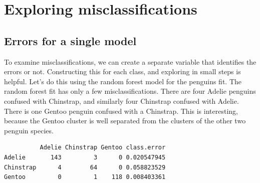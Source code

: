 \documentclass[
  letterpaper,
]{krantz}
\newenvironment{Shaded}{\begin{snugshade}}{\end{snugshade}}
\newcommand{\AttributeTok}[1]{\textcolor[rgb]{0.40,0.45,0.13}{#1}}
\newcommand{\DecValTok}[1]{\textcolor[rgb]{0.68,0.00,0.00}{#1}}
\newcommand{\FunctionTok}[1]{\textcolor[rgb]{0.28,0.35,0.67}{#1}}
\newcommand{\NormalTok}[1]{\textcolor[rgb]{0.00,0.23,0.31}{#1}}
\newcommand{\OtherTok}[1]{\textcolor[rgb]{0.00,0.23,0.31}{#1}}
\newcommand{\SpecialCharTok}[1]{\textcolor[rgb]{0.37,0.37,0.37}{#1}}
\begin{document}

\chapter{Exploring
misclassifications}\label{exploring-misclassifications}


\section{Errors for a single model}\label{errors-for-a-single-model}

To examine misclassifications, we can create a separate variable that
identifies the errors or not. Constructing this for each class, and
exploring in small steps is helpful. Let's do this using the random
forest model for the penguins fit. The random forest fit has only a few
misclassifications. There are four Adelie penguins confused with
Chinstrap, and similarly four Chinstrap confused with Adelie. There is
one Gentoo penguin confused with a Chinstrap. This is interesting,
because the Gentoo cluster is well separated from the clusters of the
other two penguin species.


\begin{Shaded}
\end{Shaded}

\begin{verbatim}
          Adelie Chinstrap Gentoo class.error
Adelie       143         3      0 0.020547945
Chinstrap      4        64      0 0.058823529
Gentoo         0         1    118 0.008403361
\end{verbatim}

\begin{Shaded}
\end{Shaded}
\end{document}
